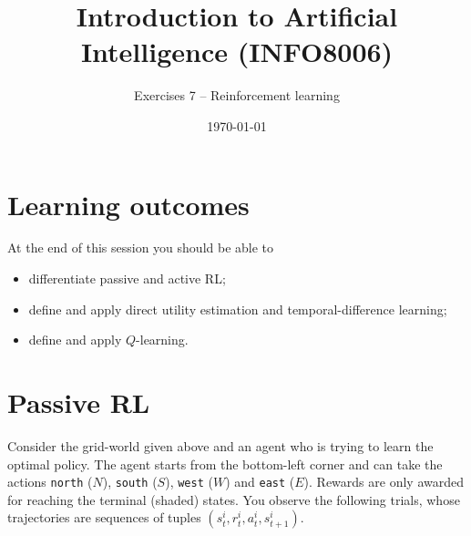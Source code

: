 \documentclass[11pt, a4paper]{article}
\title{Introduction to Artificial Intelligence (INFO8006)}
\subtitle{Exercises 7 -- Reinforcement learning}
\date{\today}
\begin{document}
\maketitle

\section*{Learning outcomes}

At the end of this session you should be able to
\begin{itemize}[noitemsep]
    \item differentiate passive and active RL;
    \item define and apply direct utility estimation and temporal-difference learning;
    \item define and apply $Q$-learning.
\end{itemize}

\section{Passive RL}

\begin{figure}[h]
    \centering
    \vspace{-1ex}
\end{figure}

Consider the grid-world given above and an agent who is trying to learn the optimal policy. The agent starts from the bottom-left corner and can take the actions \texttt{north} ($N$), \texttt{south} ($S$), \texttt{west} ($W$) and \texttt{east} ($E$). Rewards are only awarded for reaching the terminal (shaded) states. You observe the following trials, whose trajectories are sequences of tuples $(s^i_t, r^i_t, a^i_t, s^i_{t+1})$.
\end{document}
